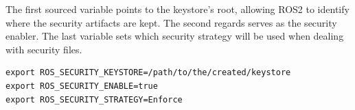 The first sourced variable points to the keystore's root, allowing ROS2 to identify where the security artifacts are kept. The second regards serves as the security enabler. The last variable sets which security strategy will be used when dealing with security files.
            
\begin{lstlisting}[title={SROS2 environment variables.}]
export ROS_SECURITY_KEYSTORE=/path/to/the/created/keystore
export ROS_SECURITY_ENABLE=true
export ROS_SECURITY_STRATEGY=Enforce
\end{lstlisting}


            
                


